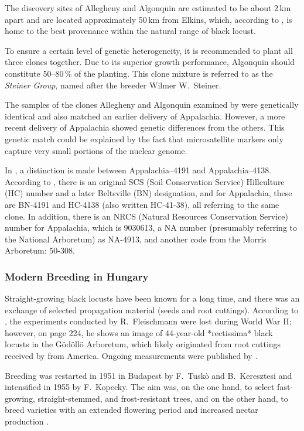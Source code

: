The discovery sites of Allegheny and Algonquin are estimated to be about 2\,km apart and are located approximately 50\,km from Elkins, which, according to \citet{hopp1941robinie}, is home to the best provenance within the natural range of black locust.

To ensure a certain level of genetic heterogeneity, it is recommended to plant all three clones together. Due to its superior growth performance, Algonquin should constitute 50--80\,\% of the planting. This clone mixture is referred to as the \emph{Steiner Group}, named after the breeder Wilmer W.~Steiner.

The samples of the clones Allegheny and Algonquin examined by \citet{liesebach2012robinie} were genetically identical and also matched an earlier delivery of Appalachia. However, a more recent delivery of Appalachia showed genetic differences from the others. This genetic match could be explained by the fact that microsatellite markers only capture very small portions of the nuclear genome.

In \citet{liesebach2021robinie}, a distinction is made between Appalachia--4191 and Appalachia--4138. According to \citet{steinergroup1987robinie}, there is an original SCS (Soil Conservation Service) Hillculture (HC) number and a later Beltsville (BN) designation, and for Appalachia, these are BN-4191 and HC-4138 (also written HC-41-38), all referring to the same clone. In addition, there is an NRCS (Natural Resources Conservation Service) number for Appalachia, which is 9030613, a NA number (presumably referring to the National Arboretum) as NA-4913, and another code from the Morris Arboretum: 50-308.

\subsubsection{Modern Breeding in Hungary}

Straight-growing black locusts have been known for a long time, and there was an exchange of selected propagation material (seeds and root cuttings). According to \citep{keresztesi1983robinie}, the experiments conducted by R.~Fleischmann were lost during World War II; however, on page 224, he shows an image of 44-year-old *rectissima* black locusts in the Gödöllö Arboretum, which likely originated from root cuttings received by \citet{mihalyi1937robinie} from America. Ongoing measurements were published by \citet{bujtas1984robinie}.

Breeding was restarted in 1951 in Budapest by F.~Tuskò and B.~Keresztesi and intensified in 1955 by F.~Kopecky. The aim was, on the one hand, to select fast-growing, straight-stemmed, and frost-resistant trees, and on the other hand, to breed varieties with an extended flowering period and increased nectar production \citep{redei2007robinieSelektion,csiha2016robinie}.

